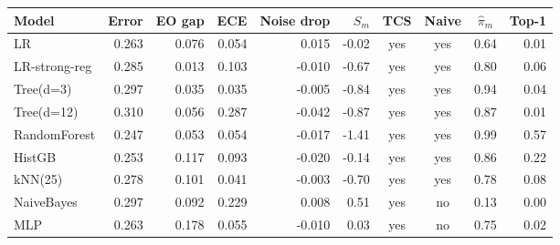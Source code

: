 \begin{tabular}{lrrrrrcccr}\toprule
Model & Error & EO gap & ECE & Noise drop & $S_m$ & TCS & Naive & $\hat\pi_m$ & Top-1 \\\midrule
LR & 0.263 & 0.076 & 0.054 & 0.015 & -0.02 & yes & yes & 0.64 & 0.01 \\
LR-strong-reg & 0.285 & 0.013 & 0.103 & -0.010 & -0.67 & yes & yes & 0.80 & 0.06 \\
Tree(d=3) & 0.297 & 0.035 & 0.035 & -0.005 & -0.84 & yes & yes & 0.94 & 0.04 \\
Tree(d=12) & 0.310 & 0.056 & 0.287 & -0.042 & -0.87 & yes & yes & 0.87 & 0.01 \\
RandomForest & 0.247 & 0.053 & 0.054 & -0.017 & -1.41 & yes & yes & 0.99 & 0.57 \\
HistGB & 0.253 & 0.117 & 0.093 & -0.020 & -0.14 & yes & yes & 0.86 & 0.22 \\
kNN(25) & 0.278 & 0.101 & 0.041 & -0.003 & -0.70 & yes & yes & 0.78 & 0.08 \\
NaiveBayes & 0.297 & 0.092 & 0.229 & 0.008 & 0.51 & yes & no & 0.13 & 0.00 \\
MLP & 0.263 & 0.178 & 0.055 & -0.010 & 0.03 & yes & no & 0.75 & 0.02 \\
\bottomrule\end{tabular}